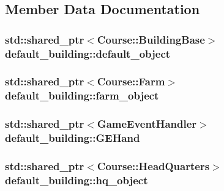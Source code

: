 \subsection{Member Data Documentation}
\hypertarget{classdefault__building_afa2b3230dc8c603474fcf7dbf76c47c4}{
\subsubsection[{default\-\_\-object}]{\setlength{\rightskip}{0pt plus 5cm}std\-::shared\-\_\-ptr$<${\bf Course\-::\-Building\-Base}$>$ default\-\_\-building\-::default\-\_\-object\hspace{0.3cm}{\ttfamily [private]}}}\label{classdefault__building_afa2b3230dc8c603474fcf7dbf76c47c4}
\hypertarget{classdefault__building_aa38e3d845ceeb470e23d4a074f797500}{
\subsubsection[{farm\-\_\-object}]{\setlength{\rightskip}{0pt plus 5cm}std\-::shared\-\_\-ptr$<${\bf Course\-::\-Farm}$>$ default\-\_\-building\-::farm\-\_\-object\hspace{0.3cm}{\ttfamily [private]}}}\label{classdefault__building_aa38e3d845ceeb470e23d4a074f797500}
\hypertarget{classdefault__building_a7bf9c55301d5a6027d016bf76cb585ce}{
\subsubsection[{G\-E\-Hand}]{\setlength{\rightskip}{0pt plus 5cm}std\-::shared\-\_\-ptr$<${\bf Game\-Event\-Handler}$>$ default\-\_\-building\-::\-G\-E\-Hand\hspace{0.3cm}{\ttfamily [private]}}}\label{classdefault__building_a7bf9c55301d5a6027d016bf76cb585ce}
\hypertarget{classdefault__building_a0badf4ed00b36044834272bc3ebf94d3}{
\subsubsection[{hq\-\_\-object}]{\setlength{\rightskip}{0pt plus 5cm}std\-::shared\-\_\-ptr$<${\bf Course\-::\-Head\-Quarters}$>$ default\-\_\-building\-::hq\-\_\-object\hspace{0.3cm}{\ttfamily [private]}}}\label{classdefault__building_a0badf4ed00b36044834272bc3ebf94d3}
